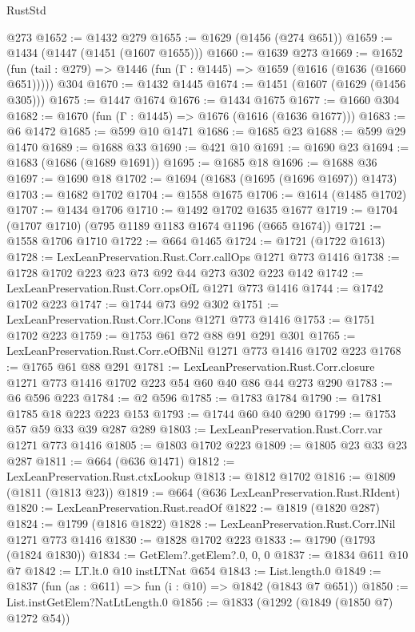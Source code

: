 \begin{lexlean}{RustStd}
\begin{coremodule}
    @273
@1652 := @1432 @279
@1655 := @1629 (@1456 (@274 @651))
@1659 := @1434 (@1447 (@1451 (@1607 @1655)))
@1660 := @1639 @273
@1669 := @1652
    (fun (tail : @279) => @1446 (fun (Γ : @1445) => @1659 (@1616 (@1636 (@1660 @651)))))
    @304
@1670 := @1432 @1445
@1674 := @1451 (@1607 (@1629 (@1456 @305)))
@1675 := @1447 @1674
@1676 := @1434 @1675
@1677 := @1660 @304
@1682 := @1670 (fun (Γ : @1445) => @1676 (@1616 (@1636 @1677)))
@1683 := @6 @1472
@1685 := @599 @10 @1471
@1686 := @1685 @23
@1688 := @599 @29 @1470
@1689 := @1688 @33
@1690 := @421 @10
@1691 := @1690 @23
@1694 := @1683 (@1686 (@1689 @1691))
@1695 := @1685 @18
@1696 := @1688 @36
@1697 := @1690 @18
@1702 := @1694 (@1683 (@1695 (@1696 @1697)) @1473)
@1703 := @1682 @1702
@1704 := @1558 @1675
@1706 := @1614 (@1485 @1702)
@1707 := @1434 @1706
@1710 := @1492 @1702 @1635 @1677
@1719 := @1704 (@1707 @1710) (@795 @1189 @1183 @1674 @1196 (@665 @1674))
@1721 := @1558 @1706 @1710
@1722 := @664 @1465
@1724 := @1721 (@1722 @1613)
@1728 := LexLeanPreservation.Rust.Corr.callOps @1271 @773 @1416
@1738 := @1728 @1702 @223 @23 @73 @92 @44 @273 @302 @223 @142
@1742 := LexLeanPreservation.Rust.Corr.opsOfL @1271 @773 @1416
@1744 := @1742 @1702 @223
@1747 := @1744 @73 @92 @302
@1751 := LexLeanPreservation.Rust.Corr.lCons @1271 @773 @1416
@1753 := @1751 @1702 @223
@1759 := @1753 @61 @72 @88 @91 @291 @301
@1765 := LexLeanPreservation.Rust.Corr.eOfBNil @1271 @773 @1416 @1702 @223
@1768 := @1765 @61 @88 @291
@1781 := LexLeanPreservation.Rust.Corr.closure
    @1271
    @773
    @1416
    @1702
    @223
    @54
    @60
    @40
    @86
    @44
    @273
    @290
@1783 := @6 @596 @223
@1784 := @2 @596
@1785 := @1783 @1784
@1790 := @1781 @1785 @18 @223 @223 @153
@1793 := @1744 @60 @40 @290
@1799 := @1753 @57 @59 @33 @39 @287 @289
@1803 := LexLeanPreservation.Rust.Corr.var @1271 @773 @1416
@1805 := @1803 @1702 @223
@1809 := @1805 @23 @33 @23 @287
@1811 := @664 (@636 @1471)
@1812 := LexLeanPreservation.Rust.ctxLookup
@1813 := @1812 @1702
@1816 := @1809 (@1811 (@1813 @23))
@1819 := @664 (@636 LexLeanPreservation.Rust.RIdent)
@1820 := LexLeanPreservation.Rust.readOf
@1822 := @1819 (@1820 @287)
@1824 := @1799 (@1816 @1822)
@1828 := LexLeanPreservation.Rust.Corr.lNil @1271 @773 @1416
@1830 := @1828 @1702 @223
@1833 := @1790 (@1793 (@1824 @1830))
@1834 := GetElem?.getElem?.{0, 0, 0}
@1837 := @1834 @611 @10 @7
@1842 := LT.lt.{0} @10 instLTNat @654
@1843 := List.length.{0}
@1849 := @1837 (fun (as : @611) => fun (i : @10) => @1842 (@1843 @7 @651))
@1850 := List.instGetElem?NatLtLength.{0}
@1856 := @1833 (@1292 (@1849 (@1850 @7) @1272 @54))

\end{coremodule}
\end{lexlean}
